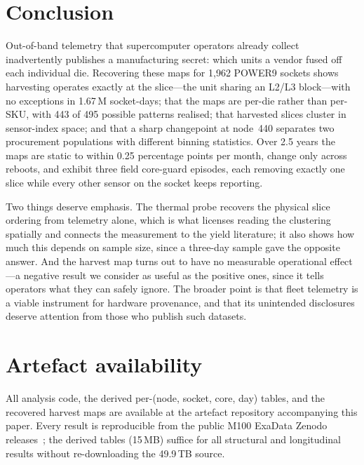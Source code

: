 \documentclass[10pt,conference]{IEEEtran}
\begin{document}
\section{Conclusion}
Out-of-band telemetry that supercomputer operators already collect inadvertently publishes a
manufacturing secret: which units a vendor fused off each individual die. Recovering these maps for
1{,}962 POWER9 sockets shows harvesting operates exactly at the slice---the unit sharing an L2/L3
block---with no exceptions in 1.67\,M socket-days; that the maps are per-die rather than per-SKU,
with 443 of 495 possible patterns realised; that harvested slices cluster in sensor-index space;
and that a sharp changepoint at node~440 separates two procurement populations with different
binning statistics. Over 2.5 years the maps are static to within 0.25 percentage points per month,
change only across reboots, and exhibit three field core-guard episodes, each removing exactly one
slice while every other sensor on the socket keeps reporting.

Two things deserve emphasis. The thermal probe recovers the physical slice ordering from telemetry
alone, which is what licenses reading the clustering spatially and connects the measurement to the
yield literature; it also shows how much this depends on sample size, since a three-day sample gave
the opposite answer. And the harvest map turns out to have no measurable operational effect---a
negative result we consider as useful as the positive ones, since it tells operators what they can
safely ignore.
The broader point is that fleet telemetry is a viable instrument for hardware provenance, and that
its unintended disclosures deserve attention from those who publish such datasets.

\section*{Artefact availability}
All analysis code, the derived per-(node, socket, core, day) tables, and the recovered harvest maps
are available at the artefact repository accompanying this paper. Every result is reproducible from
the public M100 ExaData Zenodo releases~\cite{borghesi2023m100}; the derived tables (15\,MB)
suffice for all structural and longitudinal results without re-downloading the 49.9\,TB source.



\end{document}
